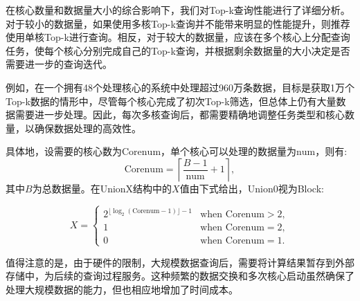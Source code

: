 



在核心数量和数据量大小的综合影响下，我们对Top-k查询性能进行了详细分析。对于较小的数据量，如果使用多核Top-k查询并不能带来明显的性能提升，则推荐使用单核Top-k进行查询。相反，对于较大的数据量，应该在多个核心上分配查询任务，使每个核心分别完成自己的Top-k查询，并根据剩余数据量的大小决定是否需要进一步的查询迭代。

例如，在一个拥有48个处理核心的系统中处理超过960万条数据，目标是获取1万个Top-k数据的情形中，尽管每个核心完成了初次Top-k筛选，但总体上仍有大量数据需要进一步处理。因此，每次多核查询后，都需要精确地调整任务类型和核心数量，以确保数据处理的高效性。

具体地，设需要的核心数为\( \text{Corenum} \)，单个核心可以处理的数据量为\( \text{num} \)，则有:
\[
\text{Corenum} = \left\lceil \frac{B - 1}{\text{num}} + 1 \right\rceil,
\]
其中\( B \)为总数据量。在UnionX结构中的\( X \)值由下式给出，Union0视为Block:

\[
X = 
\begin{cases} 
2^{\lfloor \log_2(\text{Corenum} - 1) \rfloor - 1} & \text{when } \text{Corenum} > 2,\\
1 & \text{when } \text{Corenum} = 2,\\
0 & \text{when } \text{Corenum} = 1.
\end{cases}
\]


值得注意的是，由于硬件的限制，大规模数据查询后，需要将计算结果暂存到外部存储中，为后续的查询过程服务。这种频繁的数据交换和多次核心启动虽然确保了处理大规模数据的能力，但也相应地增加了时间成本。




